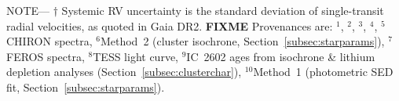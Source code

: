 \begin{table*}
\begin{tabular}{llcc}
\hline
\end{tabular}
\begin{flushleft}
 \footnotesize{ \textsc{NOTE}---
$\dagger$ Systemic RV uncertainty is the standard deviation of single-transit radial velocities, as quoted in Gaia DR2. %
  {\bf FIXME}
Provenances are:
$^1$\citet{gaia_collaboration_gaia_2018},
$^2$\citet{stassun_TIC8_2019},
$^3$\citet{skrutskie_tmass_2006},
$^4$\citet{wright_WISE_2010},
$^5$CHIRON spectra,
$^6$Method~2 (cluster isochrone, Section~\ref{subsec:starparams}),
$^7$FEROS spectra,
$^8$TESS light curve,
$^9$IC~2602 ages from isochrone \& lithium depletion analyses (Section~\ref{subsec:clusterchar}),
$^{10}$Method~1 (photometric SED fit, Section~\ref{subsec:starparams}).}
\end{flushleft}
\vspace{-0.5cm}
\end{table*}
